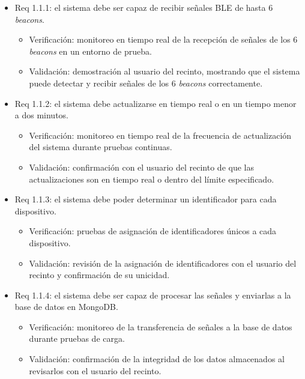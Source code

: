 \documentclass[
11pt, %
]{charter}
\begin{document}
\begin{itemize} 
\item Req 1.1.1: el sistema debe ser capaz de recibir señales BLE de hasta 6 \textit{beacons}.

\begin{itemize}
	\item Verificación: monitoreo en tiempo real de la recepción de señales de los 6 \textit{beacons} en un entorno de prueba.
	\item Validación: demostración al usuario del recinto, mostrando que el sistema puede detectar y recibir señales de los 6 \textit{beacons} correctamente.  
\end{itemize}

\item Req 1.1.2: el sistema debe actualizarse en tiempo real o en un tiempo menor a dos minutos.

\begin{itemize}
	\item Verificación: monitoreo en tiempo real de la frecuencia de actualización del sistema durante pruebas continuas.
	\item Validación: confirmación con el usuario del recinto de que las actualizaciones son en tiempo real o dentro del límite especificado.
\end{itemize}

\item Req 1.1.3: el sistema debe poder determinar un identificador para cada dispositivo.

\begin{itemize}
	\item Verificación: pruebas de asignación de identificadores únicos a cada dispositivo.
	\item Validación: revisión de la asignación de identificadores con el usuario del recinto y confirmación de su unicidad.
\end{itemize}

\item Req 1.1.4: el sistema debe ser capaz de procesar las señales y enviarlas a la base de datos en MongoDB.

\begin{itemize}
	\item Verificación: monitoreo de la transferencia de señales a la base de datos durante pruebas de carga.
	\item Validación: confirmación de la integridad de los datos almacenados al revisarlos con el usuario del recinto.
\end{itemize}


\end{itemize}
\end{document}
